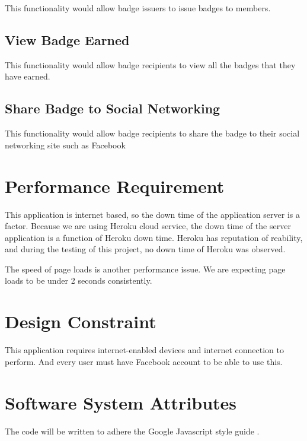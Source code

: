 This functionality would allow badge issuers to issue badges to members. 

\subsection{View Badge Earned}

This functionality would allow badge recipients to view all the badges that they have earned.

\subsection{Share Badge to Social Networking} 

This functionality would allow badge recipients to share the badge to their social networking site such as Facebook

\section{Performance Requirement}

This application is internet based, so the down time of the application server is a factor. Because we are using Heroku cloud service, the down time of the server application is a function of Heroku down time. Heroku has reputation of reability, and during the testing of this project, no down time of Heroku was observed. 

The speed of page loads is another performance issue. We are expecting page loads to be under 2 seconds consistently. 
 
\section{Design Constraint}

This application requires internet-enabled devices and internet connection to perform. And every user must have Facebook account to be able to use this. 

\section{Software System Attributes}

The code will be written to adhere the Google Javascript style guide \cite{googleguide}. 
